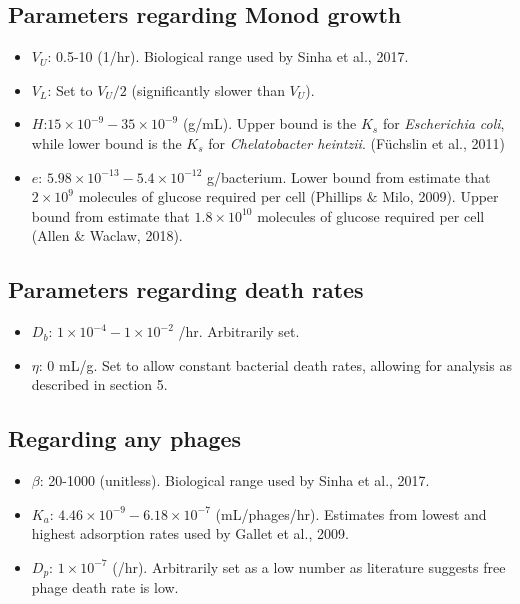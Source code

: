 \documentclass{article}
\begin{document}
\subsection{Parameters regarding Monod growth}

\begin{itemize}
\item $V_U$: 0.5-10 (1/hr). Biological range used by Sinha et al., 2017. 

\item $V_L$: Set to $V_U/2$ (significantly slower than $V_U$).

\item $H$:$15 \times 10^{-9} - 35 \times 10^{-9}$ (g/mL). Upper bound is the $K_s$ for \textit{Escherichia coli}, while lower bound is the $K_s$ for \textit{Chelatobacter heintzii}. (Füchslin et al., 2011)

\item $e$: $5.98\times 10^{-13} - 5.4 \times 10^{-12}$ g/bacterium. Lower bound from estimate that $2 \times 10^9$ molecules of glucose required per cell (Phillips $\&$ Milo, 2009).  Upper bound from estimate that $1.8 \times 10^10$ molecules of glucose required per cell (Allen $\&$ Waclaw, 2018). 
\end{itemize}

\subsection{Parameters regarding death rates}
\begin{itemize}
\item $D_b$: $1 \times 10^{-4} - 1 \times 10^{-2}$ /hr. Arbitrarily set.

\item $\eta$: 0 mL/g. Set to allow constant bacterial death rates, allowing for analysis as described in section 5.
\end{itemize}

\subsection{Regarding any phages}
\begin{itemize}
\item $\beta$: 20-1000 (unitless). Biological range used by Sinha et al., 2017. 
\item $K_a$: $4.46 \times 10^{-9} - 6.18 \times 10^{-7}$ (mL/phages/hr). Estimates from lowest and highest adsorption rates used by Gallet et al., 2009.
\item $D_p$: $1 \times 10^{-7}$ (/hr). Arbitrarily set as a low number as literature suggests free phage death rate is low.
\end{itemize}
\end{document}
